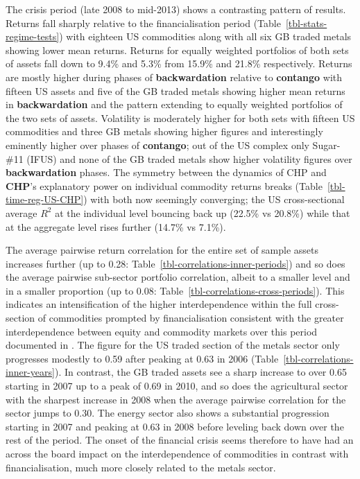\documentclass[
  authoryear,
  preprint,
  3p]{elsarticle}
\begin{document}
\bigskip
\bigskip

The crisis period (late 2008 to mid-2013) shows a contrasting pattern of
results. Returns fall sharply relative to the financialisation period
(Table~\ref{tbl-stats-regime-tests}) with eighteen US commodities along
with all six GB traded metals showing lower mean returns. Returns for
equally weighted portfolios of both sets of assets fall down to 9.4\%
and 5.3\% from 15.9\% and 21.8\% respectively. Returns are mostly higher
during phases of \textbf{backwardation} relative to \textbf{contango}
with fifteen US assets and five of the GB traded metals showing higher
mean returns in \textbf{backwardation} and the pattern extending to
equally weighted portfolios of the two sets of assets. Volatility is
moderately higher for both sets with fifteen US commodities and three GB
metals showing higher figures and interestingly eminently higher over
phases of \textbf{contango}; out of the US complex only Sugar-\#11
(IFUS) and none of the GB traded metals show higher volatility figures
over \textbf{backwardation} phases. The symmetry between the dynamics of
CHP and \textbf{CHP}'s explanatory power on individual commodity returns
breaks (Table~\ref{tbl-time-reg-US-CHP}) with both now seemingly
converging; the US cross-sectional average \(R^{2}\) at the individual
level bouncing back up (22.5\% vs 20.8\%) while that at the aggregate
level rises further (14.7\% vs 7.1\%).

\medskip

The average pairwise return correlation for the entire set of sample
assets increases further (up to 0.28:
Table~\ref{tbl-correlations-inner-periods}) and so does the average
pairwise sub-sector portfolio correlation, albeit to a smaller level and
in a smaller proportion (up to 0.08:
Table~\ref{tbl-correlations-cross-periods}). This indicates an
intensification of the higher interdependence within the full
cross-section of commodities prompted by financialisation consistent
with the greater interdependence between equity and commodity markets
over this period documented in
\citet{silvennoinen_financialisation_2013}. The figure for the US traded
section of the metals sector only progresses modestly to 0.59 after
peaking at 0.63 in 2006 (Table~\ref{tbl-correlations-inner-years}). In
contrast, the GB traded assets see a sharp increase to over 0.65
starting in 2007 up to a peak of 0.69 in 2010, and so does the
agricultural sector with the sharpest increase in 2008 when the average
pairwise correlation for the sector jumps to 0.30. The energy sector
also shows a substantial progression starting in 2007 and peaking at
0.63 in 2008 before leveling back down over the rest of the period. The
onset of the financial crisis seems therefore to have had an across the
board impact on the interdependence of commodities in contrast with
financialisation, much more closely related to the metals sector.
\end{document}

